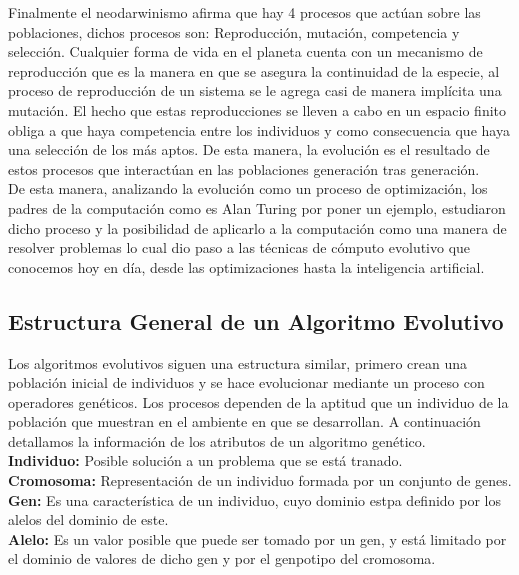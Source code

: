 		Finalmente el neodarwinismo afirma que hay 4 procesos que actúan sobre las poblaciones, dichos procesos son: Reproducción, mutación, competencia y selección. Cualquier forma de vida en el planeta cuenta con un mecanismo de reproducción que es la manera en que se asegura la continuidad de la especie, al proceso de reproducción de un sistema se le agrega casi de manera implícita una mutación. El hecho que estas reproducciones se lleven a cabo en un espacio finito obliga a que haya competencia entre los individuos y como consecuencia que haya una selección de los más aptos. De esta manera, la evolución es el resultado de estos procesos que interactúan en las poblaciones generación tras generación.\\

		De esta manera, analizando la evolución como un proceso de optimización, los padres de la computación como es Alan Turing por poner un ejemplo, estudiaron dicho proceso y la posibilidad de aplicarlo a la computación como una manera de resolver problemas lo cual dio paso a las técnicas de cómputo evolutivo que conocemos hoy en día, desde las optimizaciones hasta la inteligencia artificial.\\

		\subsection{Estructura General de un Algoritmo Evolutivo}

		Los algoritmos evolutivos siguen una estructura similar, primero crean una población inicial de individuos y se hace evolucionar mediante un proceso con operadores genéticos. Los procesos dependen de la aptitud que un individuo de la población que muestran en el ambiente en que se desarrollan. A continuación detallamos la información de los atributos de un algoritmo genético.\\

		\textbf{Individuo:} Posible solución a un problema que se está tranado.\\

		\textbf{Cromosoma:} Representación de un individuo formada por un conjunto de genes.\\

		\textbf{Gen:} Es una característica de un individuo, cuyo dominio estpa definido por los alelos del dominio de este.\\

		\textbf{Alelo:} Es un valor posible que puede ser tomado por un gen, y está limitado por el dominio de valores de dicho gen y por el genpotipo del cromosoma.\\

